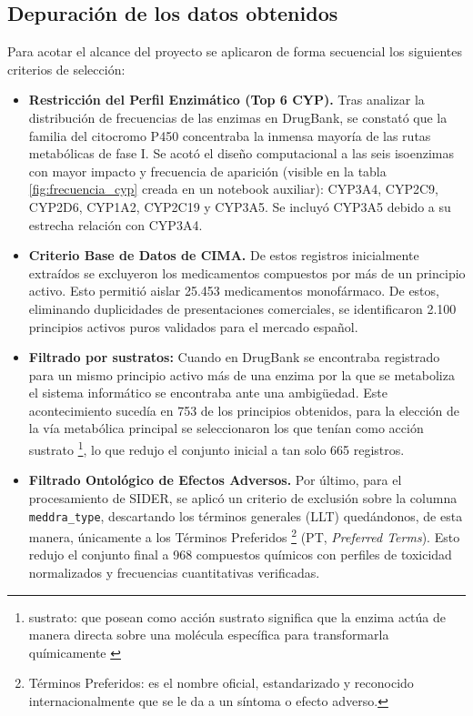 \subsection{Depuración de los datos obtenidos}
Para acotar el alcance del proyecto se aplicaron de forma secuencial los siguientes criterios de selección:
\begin{itemize}
    \item \textbf{Restricción del Perfil Enzimático (Top 6 CYP).} Tras analizar la distribución de frecuencias de las enzimas en DrugBank, se constató que la familia del citocromo P450 concentraba la inmensa mayoría de las rutas metabólicas de fase I. Se acotó el diseño computacional a las seis isoenzimas con mayor impacto y frecuencia de aparición (visible en la tabla \ref{fig:frecuencia_cyp} creada en un notebook auxiliar): CYP3A4, CYP2C9, CYP2D6, CYP1A2, CYP2C19 y CYP3A5. Se incluyó CYP3A5 debido a su estrecha relación con CYP3A4. 
    \item \textbf{Criterio Base de Datos de CIMA.} De estos registros inicialmente extraídos se excluyeron los medicamentos compuestos por más de un principio activo. Esto permitió aislar 25.453 medicamentos monofármaco. De estos, eliminando duplicidades de presentaciones comerciales, se identificaron 2.100 principios activos puros validados para el mercado español.
    \item \textbf{Filtrado por sustratos:} Cuando en DrugBank se encontraba registrado para un mismo principio activo más de una enzima por la que se metaboliza el sistema informático se encontraba ante una ambigüedad. Este acontecimiento sucedía en 753 de los principios obtenidos, para la elección de la vía metabólica principal se seleccionaron los que tenían como acción sustrato \footnote{sustrato: que posean como acción sustrato significa que la enzima actúa de manera directa sobre una molécula específica para transformarla químicamente \cite{biolan_health_enzimas}}, lo que redujo el conjunto inicial a tan solo 665 registros.
    \item \textbf{Filtrado Ontológico de Efectos Adversos.} Por último, para el procesamiento de SIDER, se aplicó un criterio de exclusión sobre la columna \texttt{meddra\_type}, descartando los términos generales (LLT) quedándonos, de esta manera, únicamente a los Términos Preferidos \footnote{Términos Preferidos: es el nombre oficial, estandarizado y reconocido internacionalmente que se le da a un síntoma o efecto adverso.} (PT, \textit{Preferred Terms}). Esto redujo el conjunto final a 968 compuestos químicos con perfiles de toxicidad normalizados y frecuencias cuantitativas verificadas.
\end{itemize}

